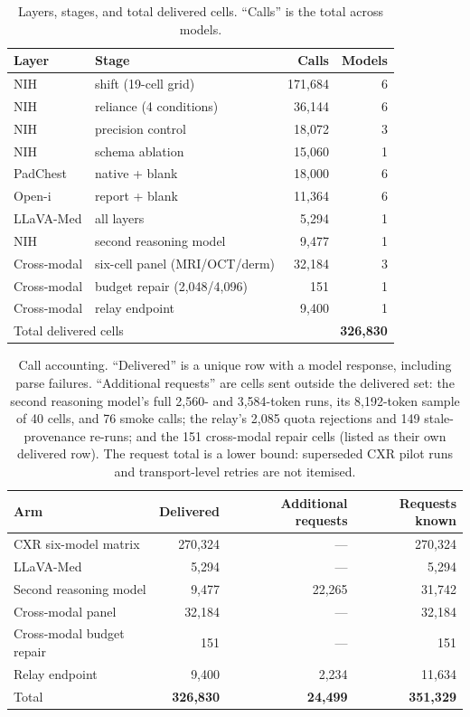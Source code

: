 \begin{table}[H]
\centering
\small
\caption{Layers, stages, and total delivered cells. ``Calls'' is the total across models.}
\label{tab:calls}
\begin{tabular}{llrr}
\toprule
Layer & Stage & Calls & Models \\
\midrule
NIH & shift (19-cell grid) & 171,684 & 6 \\
NIH & reliance (4 conditions) & 36,144 & 6 \\
NIH & precision control & 18,072 & 3 \\
NIH & schema ablation & 15,060 & 1 \\
PadChest & native + blank & 18,000 & 6 \\
Open-i & report + blank & 11,364 & 6 \\
\midrule
LLaVA-Med & all layers & 5,294 & 1 \\
NIH & second reasoning model & 9,477 & 1 \\
Cross-modal & six-cell panel (MRI/OCT/derm) & 32,184 & 3 \\
Cross-modal & budget repair (2,048/4,096) & 151 & 1 \\
Cross-modal & relay endpoint & 9,400 & 1 \\
\midrule
\multicolumn{2}{l}{Total delivered cells} & \multicolumn{2}{r}{\textbf{326,830}} \\
\bottomrule
\end{tabular}
\end{table}

\begin{table}[H]
\centering
\small
\caption{Call accounting. ``Delivered'' is a unique row with a model response, including
parse failures. ``Additional requests'' are cells sent outside the delivered set: the
second reasoning model's full 2,560- and 3,584-token runs, its 8,192-token sample of 40
cells, and 76 smoke calls; the relay's 2,085 quota rejections and 149 stale-provenance
re-runs; and the 151 cross-modal repair cells (listed as their own delivered row). The
request total is a lower bound: superseded CXR pilot runs and transport-level retries are
not itemised.}
\label{tab:call-accounting}
\begin{tabular}{lrrr}
\toprule
Arm & Delivered & Additional requests & Requests known \\
\midrule
CXR six-model matrix & 270,324 & --- & 270,324 \\
LLaVA-Med & 5,294 & --- & 5,294 \\
Second reasoning model & 9,477 & 22,265 & 31,742 \\
Cross-modal panel & 32,184 & --- & 32,184 \\
Cross-modal budget repair & 151 & --- & 151 \\
Relay endpoint & 9,400 & 2,234 & 11,634 \\
\midrule
Total & \textbf{326,830} & \textbf{24,499} & \textbf{351,329} \\
\bottomrule
\end{tabular}
\end{table}

